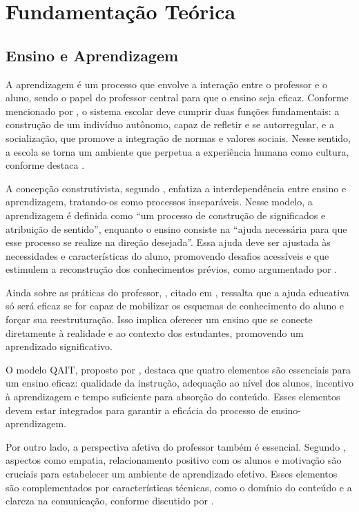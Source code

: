 \chapter{Fundamentação Teórica}\label{chp:rev}
\section{Ensino e Aprendizagem}

A aprendizagem é um processo que envolve a interação entre o professor e o aluno, sendo o papel do professor central para que o ensino seja eficaz. Conforme mencionado por \cite{DubetMartucelli1996}, o sistema escolar deve cumprir duas funções fundamentais: a construção de um indivíduo autônomo, capaz de refletir e se autorregular, e a socialização, que promove a integração de normas e valores sociais. Nesse sentido, a escola se torna um ambiente que perpetua a experiência humana como cultura, conforme destaca \cite{Forquin1992}.

A concepção construtivista, segundo \cite{Scheerens2004}, enfatiza a interdependência entre ensino e aprendizagem, tratando-os como processos inseparáveis. Nesse modelo, a aprendizagem é definida como “um processo de construção de significados e atribuição de sentido”, enquanto o ensino consiste na “ajuda necessária para que esse processo se realize na direção desejada”. Essa ajuda deve ser ajustada às necessidades e características do aluno, promovendo desafios acessíveis e que estimulem a reconstrução dos conhecimentos prévios, como argumentado por \cite{MarchesiMartin2003}.

Ainda sobre as práticas do professor, \cite{Onrubia1993}, citado em \cite{MarchesiMartin2003}, ressalta que a ajuda educativa só será eficaz se for capaz de mobilizar os esquemas de conhecimento do aluno e forçar sua reestruturação. Isso implica oferecer um ensino que se conecte diretamente à realidade e ao contexto dos estudantes, promovendo um aprendizado significativo.

O modelo QAIT, proposto por \cite{Slavin1986}, destaca que quatro elementos são essenciais para um ensino eficaz: qualidade da instrução, adequação ao nível dos alunos, incentivo à aprendizagem e tempo suficiente para absorção do conteúdo. Esses elementos devem estar integrados para garantir a eficácia do processo de ensino-aprendizagem.

Por outro lado, a perspectiva afetiva do professor também é essencial. Segundo \cite{FukudaPasquali2002}, aspectos como empatia, relacionamento positivo com os alunos e motivação são cruciais para estabelecer um ambiente de aprendizado efetivo. Esses elementos são complementados por características técnicas, como o domínio do conteúdo e a clareza na comunicação, conforme discutido por \cite{Silva1992}.

